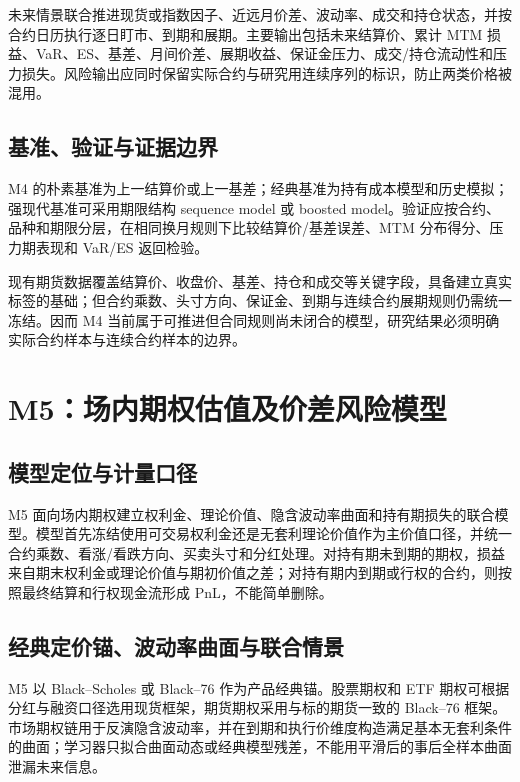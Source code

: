 未来情景联合推进现货或指数因子、近远月价差、波动率、成交和持仓状态，并按合约日历执行逐日盯市、到期和展期。主要输出包括未来结算价、累计 MTM 损益、VaR、ES、基差、月间价差、展期收益、保证金压力、成交/持仓流动性和压力损失。风险输出应同时保留实际合约与研究用连续序列的标识，防止两类价格被混用。

\subsection{基准、验证与证据边界}

M4 的朴素基准为上一结算价或上一基差；经典基准为持有成本模型和历史模拟；强现代基准可采用期限结构 sequence model 或 boosted model。验证应按合约、品种和期限分层，在相同换月规则下比较结算价/基差误差、MTM 分布得分、压力期表现和 VaR/ES 返回检验。

现有期货数据覆盖结算价、收盘价、基差、持仓和成交等关键字段，具备建立真实标签的基础；但合约乘数、头寸方向、保证金、到期与连续合约展期规则仍需统一冻结。因而 M4 当前属于可推进但合同规则尚未闭合的模型，研究结果必须明确实际合约样本与连续合约样本的边界。

\section{M5：场内期权估值及价差风险模型}
\label{sec:m5-option}

\subsection{模型定位与计量口径}

M5 面向场内期权建立权利金、理论价值、隐含波动率曲面和持有期损失的联合模型。模型首先冻结使用可交易权利金还是无套利理论价值作为主价值口径，并统一合约乘数、看涨/看跌方向、买卖头寸和分红处理。对持有期未到期的期权，损益来自期末权利金或理论价值与期初价值之差；对持有期内到期或行权的合约，则按照最终结算和行权现金流形成 PnL，不能简单删除。

\subsection{经典定价锚、波动率曲面与联合情景}

M5 以 Black--Scholes 或 Black--76 作为产品经典锚\cite{black_scholes_1973,black_1976}。股票期权和 ETF 期权可根据分红与融资口径选用现货框架，期货期权采用与标的期货一致的 Black--76 框架。市场期权链用于反演隐含波动率，并在到期和执行价维度构造满足基本无套利条件的曲面；学习器只拟合曲面动态或经典模型残差，不能用平滑后的事后全样本曲面泄漏未来信息。

